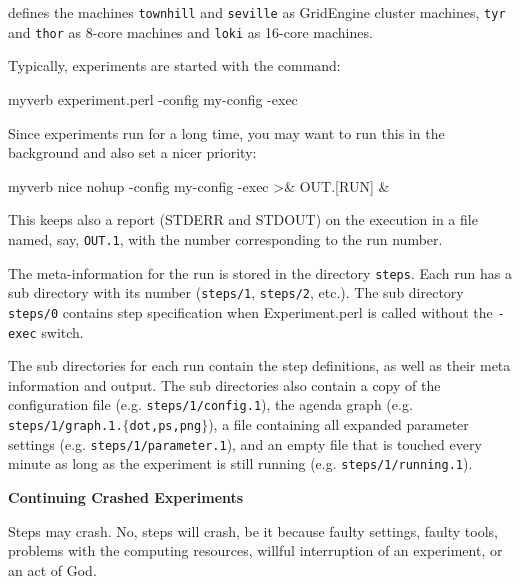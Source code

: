defines the machines {\tt townhill} and {\tt seville} as GridEngine cluster machines, {\tt tyr} and {\tt thor} as 8-core machines and {\tt loki} as 16-core machines.



Typically, experiments are started with the command:

\begin{SaveVerbatim}{myverb}
 experiment.perl -config my-config -exec
\end{SaveVerbatim}
\colorbox{gray}{%
}

Since experiments run for a long time, you may want to run this in the background and also set a nicer priority:

\begin{SaveVerbatim}{myverb}
 nice nohup -config my-config -exec >\& OUT.[RUN] \&
\end{SaveVerbatim}
\colorbox{gray}{%
}

This keeps also a report (STDERR and STDOUT) on the execution in a file named, say, {\tt OUT.1}, with the number corresponding to the run number.



The meta-information for the run is stored in the directory {\tt steps}. Each run has a sub directory with its number ({\tt steps/1}, {\tt steps/2}, etc.). The sub directory {\tt steps/0} contains step specification when Experiment.perl is called without the {\tt -exec} switch.



The sub directories for each run contain the step definitions, as well as their meta information and output. The sub directories also contain a copy of the configuration file (e.g. {\tt steps/1/config.1}), the agenda graph (e.g. {\tt steps/1/graph.1.$\{$dot,ps,png$\}$}), a file containing all expanded parameter settings (e.g. {\tt steps/1/parameter.1}), and an empty file that is touched every minute as long as the experiment is still running (e.g. {\tt steps/1/running.1}).



\vspace{2mm}

{\bf 
\label{experiment-perl.texntoc21}Continuing Crashed Experiments}


Steps may crash. No, steps will crash, be it because faulty settings, faulty tools, problems with the computing resources, willful interruption of an experiment, or an act of God.



